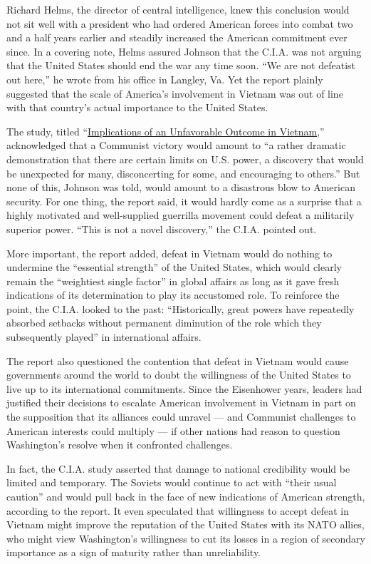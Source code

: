 Richard Helms, the director of central intelligence, knew this
conclusion would not sit well with a president who had ordered American
forces into combat two and a half years earlier and steadily increased
the American commitment ever since. In a covering note, Helms assured
Johnson that the C.I.A. was not arguing that the United States should
end the war any time soon. ``We are not defeatist out here,'' he wrote
from his office in Langley, Va. Yet the report plainly suggested that
the scale of America's involvement in Vietnam was out of line with that
country's actual importance to the United States.

The study, titled
``\href{https://www.cia.gov/library/readingroom/docs/DOC_0001166443.pdf}{Implications
of an Unfavorable Outcome in Vietnam},'' acknowledged that a Communist
victory would amount to ``a rather dramatic demonstration that there are
certain limits on U.S. power, a discovery that would be unexpected for
many, disconcerting for some, and encouraging to others.'' But none of
this, Johnson was told, would amount to a disastrous blow to American
security. For one thing, the report said, it would hardly come as a
surprise that a highly motivated and well-supplied guerrilla movement
could defeat a militarily superior power. ``This is not a novel
discovery,'' the C.I.A. pointed out.

More important, the report added, defeat in Vietnam would do nothing to
undermine the ``essential strength'' of the United States, which would
clearly remain the ``weightiest single factor'' in global affairs as
long as it gave fresh indications of its determination to play its
accustomed role. To reinforce the point, the C.I.A. looked to the past:
``Historically, great powers have repeatedly absorbed setbacks without
permanent diminution of the role which they subsequently played'' in
international affairs.

The report also questioned the contention that defeat in Vietnam would
cause governments around the world to doubt the willingness of the
United States to live up to its international commitments. Since the
Eisenhower years, leaders had justified their decisions to escalate
American involvement in Vietnam in part on the supposition that its
alliances could unravel --- and Communist challenges to American
interests could multiply --- if other nations had reason to question
Washington's resolve when it confronted challenges.

In fact, the C.I.A. study asserted that damage to national credibility
would be limited and temporary. The Soviets would continue to act with
``their usual caution'' and would pull back in the face of new
indications of American strength, according to the report. It even
speculated that willingness to accept defeat in Vietnam might improve
the reputation of the United States with its NATO allies, who might view
Washington's willingness to cut its losses in a region of secondary
importance as a sign of maturity rather than unreliability.

